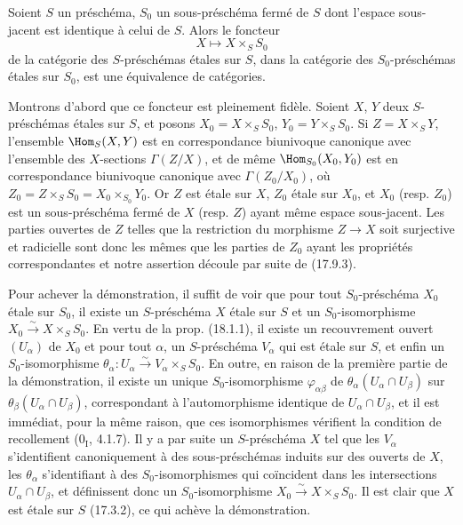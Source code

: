 \begin{theorem}[18.1.2]
\label{IV.18.1.2}
Soient $S$ un préschéma, $S_0$ un sous-préschéma fermé de $S$ dont l'espace sous-jacent est identique à celui de $S$. Alors le foncteur
\[
  X\longmapsto X\times_S S_0
\]
de la catégorie des $S$-préschémas étales sur $S$, dans la catégorie des $S_0$-préschémas étales sur $S_0$, est une équivalence de catégories.
\end{theorem}

Montrons d'abord que ce foncteur est pleinement fidèle. Soient $X$, $Y$ deux $S$-préschémas étales sur $S$, et posons $X_0=X\times_S S_0$, $Y_0=Y\times_S S_0$. Si $Z=X\times_S Y$, l'ensemble $\Hom_S(X,Y)$ est en correspondance biunivoque canonique avec l'ensemble des $X$-sections $\Gamma(Z/X)$, et de même $\Hom_{S_0}(X_0,Y_0)$ est en correspondance biunivoque canonique avec $\Gamma(Z_0/X_0)$, où $Z_0=Z\times_S S_0=X_0\times_{S_0}Y_0$. Or $Z$ est étale sur $X$, $Z_0$ étale sur $X_0$, et $X_0$ (resp. $Z_0$) est un sous-préschéma fermé de $X$ (resp. $Z$) ayant même espace sous-jacent. Les parties ouvertes de $Z$ telles que la restriction du morphisme $Z\to X$ soit surjective et radicielle sont donc les mêmes que les parties de $Z_0$ ayant les propriétés correspondantes et notre assertion découle par suite de (17.9.3).

Pour achever la démonstration, il suffit de voir que pour tout $S_0$-préschéma $X_0$ étale sur $S_0$, il existe un $S$-préschéma $X$ étale sur $S$ et un $S_0$-isomorphisme $X_0\xrightarrow{\sim}X\times_S S_0$. En vertu de la prop. (18.1.1), il existe un recouvrement ouvert $(U_\alpha)$ de $X_0$ et pour tout $\alpha$, un $S$-préschéma $V_\alpha$ qui est étale sur $S$, et enfin un $S_0$-isomorphisme $\theta_\alpha:U_\alpha\xrightarrow{\sim}V_\alpha\times_S S_0$. En outre, en raison de la première partie de la démonstration, il existe un unique $S_0$-isomorphisme $\varphi_{\alpha\beta}$ de $\theta_\alpha(U_\alpha\cap U_\beta)$ sur $\theta_\beta(U_\alpha\cap U_\beta)$, correspondant à l'automorphisme identique de $U_\alpha\cap U_\beta$, et il est immédiat, pour la même raison, que ces isomorphismes vérifient la condition de recollement ($0_{\mathrm I}$, 4.1.7). Il y a par suite un $S$-préschéma $X$ tel que les $V_\alpha$ s'identifient canoniquement à des sous-préschémas induits sur des ouverts de $X$, les $\theta_\alpha$ s'identifiant à des $S_0$-isomorphismes qui coïncident dans les intersections $U_\alpha\cap U_\beta$, et définissent donc un $S_0$-isomorphisme $X_0\xrightarrow{\sim}X\times_S S_0$. Il est clair que $X$ est étale sur $S$ (17.3.2), ce qui achève la démonstration.

